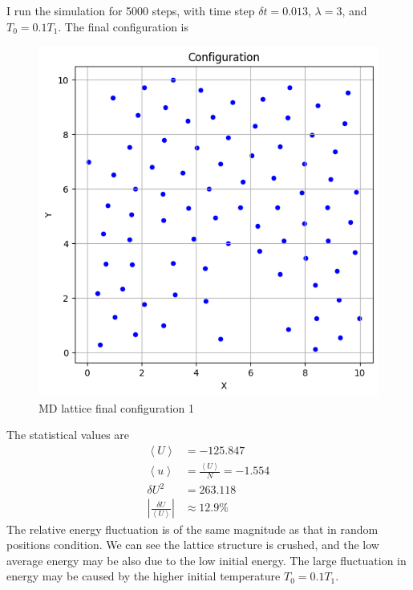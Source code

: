 \documentclass[letterpaper,12pt]{article}
\numberwithin{equation}{section}
\begin{document}
\begin{enumerate}[label=(\alph*)]
    I run the simulation for 5000 steps, with time step $\delta t=0.013$, $\lambda=3$, and $T_0=0.1T_1$. The final configuration is 
    \begin{figure}[H]
        \centering
        \includegraphics{Project/final_config_lattice_md1.png}
        \caption{MD lattice final configuration 1}
        \label{fig:final_config_lattice_md1}
    \end{figure}
    The statistical values are 
    \begin{equation}
        \begin{aligned}
            \left\langle U\right\rangle&= -125.847    \\
            \left\langle u\right\rangle&=\frac{\left\langle U\right\rangle}{N}=-1.554            \\
            \delta U^2&=263.118  \\
            \left| \frac{\delta U}{\left \langle U\right\rangle} \right|&\approx 12.9\%
        \end{aligned}
    \end{equation}
    The relative energy fluctuation is of the same magnitude as that in random positions condition. We can see the lattice structure is crushed, and the low average energy may be also due to the low initial energy. The large fluctuation in energy may be caused by the higher initial temperature $T_0=0.1T_1$.
\end{enumerate}
\end{document}
